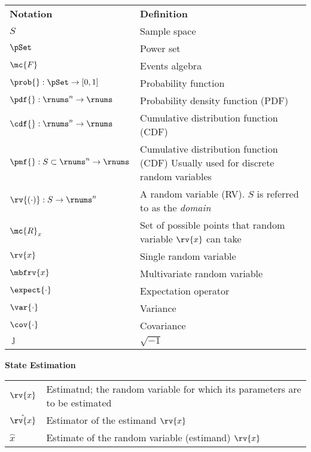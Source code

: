 \begin{table}[h]
    \centering
    \begin{tabular}{p{}p{}}
        \textbf{Notation} & \textbf{Definition}\\[5pt]
        $S$ & Sample space\\
        $\pSet$ & Power set \\
        $\mc{F}$ & Events algebra\\
        $\prob{}:\pSet\to[0,1]$ & Probability function\\
        $\pdf{}:\rnums^{n}\to\rnums$ & Probability density function (PDF)\\
        $\cdf{}:\rnums^{n}\to\rnums$ & Cumulative distribution function (CDF)\\
        $\pmf{}:S\subset\rnums^{n}\to\rnums$ & Cumulative distribution function (CDF) Usually used for discrete random variables\\
        $\rv{(\cdot)}: S\to\rnums^{n}$& A random variable (RV). $S$ is referred to as the \emph{domain} \\
        $\mc{R}_{x}$& Set of possible points that random variable $\rv{x}$ can take \\
        $\rv{x}$ & Single random variable\\
        $\mbfrv{x}$ & Multivariate random variable   \\
        $\expect{\cdot}$ & Expectation operator\\
        $\var{\cdot}$ & Variance      \\
        $\cov{\cdot}$ & Covariance      \\
        $\jmath$ & $\sqrt{-1}$             
    \end{tabular}
\end{table}

\begin{center}
    \textbf{State Estimation}
\end{center}

\begin{table}[H]
    \centering
    \begin{tabular}{p{}p{}}
        ${\rv{x}}$ & Estimatnd; the random variable for which its parameters are to be estimated\\        
        $\hat{\rv{x}}$ & Estimator of the estimand $\rv{x}$\\        
        $\hat{x}$ & Estimate of the random variable (estimand) $\rv{x}$
    \end{tabular}
\end{table}


